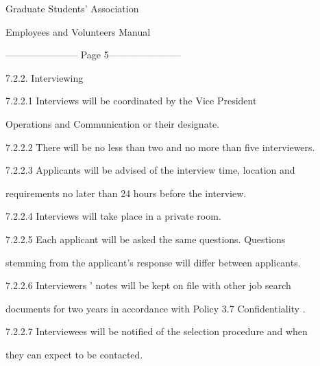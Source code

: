   

                                 Graduate Students’ Association  

                              Employees and Volunteers Manual  


----------------------- Page 5-----------------------

          7.2.2. Interviewing  



7.2.2.1 Interviews    will    be    coordinated    by    the    Vice    President    

Operations    and Communication or their designate.  



  



7.2.2.2 There will be no less than two and no more than five interviewers.  



  



7.2.2.3 Applicants  will  be  advised  of  the  interview  time,  location  and  

         requirements  no later than 24 hours before the interview.  



  



7.2.2.4 Interviews will take place in a private room.  



  



7.2.2.5 Each  applicant  will  be  asked  the  same  questions.  Questions  

stemming  from  the applicant’s response will differ between applicants.  



  



7.2.2.6 Interviewers ’   notes   will   be   kept   on   file   with   other   job   search    

documents   for   two years in accordance with Policy 3.7 Confidentiality .  



  



7.2.2.7 Interviewees will be notified of the selection procedure and when  

         they can expect to be contacted.  



